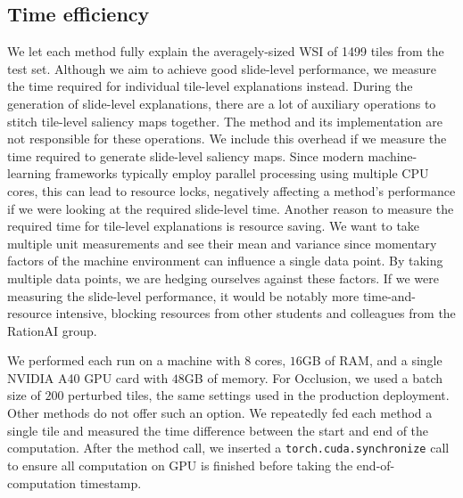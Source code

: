 \subsection*{Time efficiency}

 We let each method fully explain the averagely-sized WSI of 1499 tiles from the test set.
 Although we aim to achieve good slide-level performance, we measure the time required for individual tile-level explanations instead.
 During the generation of slide-level explanations, there are a lot of auxiliary operations to stitch tile-level saliency maps together.
 The method and its implementation are not responsible for these operations.
 We include this overhead if we measure the time required to generate slide-level saliency maps.
 Since modern machine-learning frameworks typically employ parallel processing using multiple CPU cores, this can lead to resource locks, negatively affecting a method's performance if we were looking at the required slide-level time.
 Another reason to measure the required time for tile-level explanations is resource saving.
 We want to take multiple unit measurements and see their mean and variance since momentary factors of the machine environment can influence a single data point. 
 By taking multiple data points, we are hedging ourselves against these factors.
 If we were measuring the slide-level performance, it would be notably more time-and-resource intensive, blocking resources from other students and colleagues from the RationAI group.

 We performed each run on a machine with $8$ cores, $16$GB of RAM, and a single NVIDIA A40 GPU card with $48$GB of memory.
 For Occlusion, we used a batch size of $200$ perturbed tiles, the same settings used in the production deployment.
 Other methods do not offer such an option. We repeatedly fed each method a single tile and measured the time difference between the start and end of the computation.
 After the method call, we inserted a \texttt{torch.cuda.synchronize} call to ensure all computation on GPU is finished before taking the end-of-computation timestamp.

